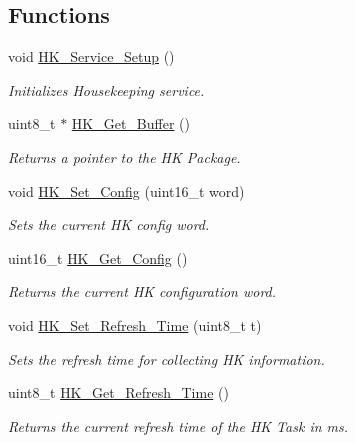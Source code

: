 \subsection*{Functions}
\begin{DoxyCompactItemize}
\item 
void \hyperlink{group___housekeeping___service_gac59d791680b33dd9ce060d6cd1c8d503}{H\+K\+\_\+\+Service\+\_\+\+Setup} ()
\begin{DoxyCompactList}\small\item\em Initializes Housekeeping service. \end{DoxyCompactList}\item 
uint8\+\_\+t $\ast$ \hyperlink{group___housekeeping___service_ga18db64c11f8d6334b8e954d70da0045e}{H\+K\+\_\+\+Get\+\_\+\+Buffer} ()
\begin{DoxyCompactList}\small\item\em Returns a pointer to the HK Package. \end{DoxyCompactList}\item 
void \hyperlink{group___housekeeping___service_ga4df6d95ad8240c83fae869b1cdf25c5e}{H\+K\+\_\+\+Set\+\_\+\+Config} (uint16\+\_\+t word)
\begin{DoxyCompactList}\small\item\em Sets the current HK config word. \end{DoxyCompactList}\item 
uint16\+\_\+t \hyperlink{group___housekeeping___service_ga8f8a150f9356f9acaa04e0fa6845c665}{H\+K\+\_\+\+Get\+\_\+\+Config} ()
\begin{DoxyCompactList}\small\item\em Returns the current HK configuration word. \end{DoxyCompactList}\item 
void \hyperlink{group___housekeeping___service_gafc2f4843a1264e16569eed48653b9d5c}{H\+K\+\_\+\+Set\+\_\+\+Refresh\+\_\+\+Time} (uint8\+\_\+t t)
\begin{DoxyCompactList}\small\item\em Sets the refresh time for collecting HK information. \end{DoxyCompactList}\item 
uint8\+\_\+t \hyperlink{group___housekeeping___service_ga302ac334855fd8caa8f08bdb8ccd14d8}{H\+K\+\_\+\+Get\+\_\+\+Refresh\+\_\+\+Time} ()
\begin{DoxyCompactList}\small\item\em Returns the current refresh time of the HK Task in ms. \end{DoxyCompactList}\end{DoxyCompactItemize}


